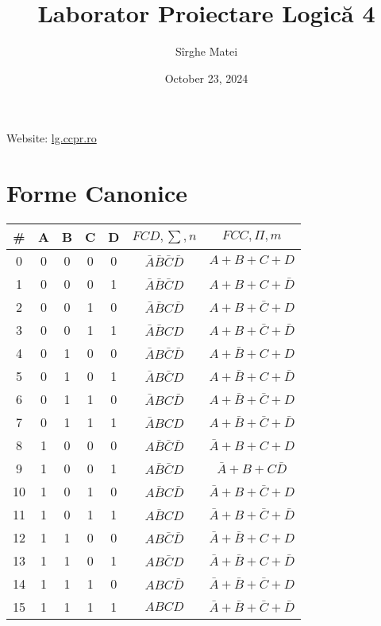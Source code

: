 \documentclass[12pt]{article}
\title{\bfseries Laborator Proiectare Logică 4}
\author{Sîrghe Matei}
\date{October 23, 2024}
\begin{document}
\maketitle

Website: \href{https://lg.ccpr.ro/}{lg.ccpr.ro}

\section{Forme Canonice}

\renewcommand{\arraystretch}{1.1}

\begin{table}[h!]
    \centering
    \begin{tabular}{|c|c|c|c|c|c|c|}
        \hline
        \# & A & B & C & D & $FCD,\sum,n$ & $FCC,\Pi,m$ \\ \hline
        0 & 0 & 0 & 0 & 0 & $\bar{A}\bar{B}\bar{C}\bar{D}$ & $A+B+C+D$ \\ \hline
        1 & 0 & 0 & 0 & 1 & $\bar{A}\bar{B}\bar{C}D$ & $A+B+C+\bar{D}$ \\ \hline
        2 & 0 & 0 & 1 & 0 & $\bar{A}\bar{B}C\bar{D}$ & $A+B+\bar{C}+D$ \\ \hline
        3 & 0 & 0 & 1 & 1 & $\bar{A}\bar{B}CD$ & $A+B+\bar{C}+\bar{D}$ \\ \hline
        4 & 0 & 1 & 0 & 0 & $\bar{A}B\bar{C}\bar{D}$ & $A+\bar{B}+C+D$ \\ \hline
        5 & 0 & 1 & 0 & 1 & $\bar{A}B\bar{C}D$ & $A+\bar{B}+C+\bar{D}$ \\ \hline
        6 & 0 & 1 & 1 & 0 & $\bar{A}BC\bar{D}$ & $A+\bar{B}+\bar{C}+D$ \\ \hline
        7 & 0 & 1 & 1 & 1 & $\bar{A}BCD$ & $A+\bar{B}+\bar{C}+\bar{D}$ \\ \hline
        8 & 1 & 0 & 0 & 0 & $A\bar{B}\bar{C}\bar{D}$ & $\bar{A}+B+C+D$ \\ \hline
        9 & 1 & 0 & 0 & 1 & $A\bar{B}\bar{C}D$ & $\bar{A}+B+C\bar{D}$ \\ \hline
        10 & 1 & 0 & 1 & 0 & $A\bar{B}C\bar{D}$ & $\bar{A}+B+\bar{C}+D$ \\ \hline
        11 & 1 & 0 & 1 & 1 & $A\bar{B}CD$ & $\bar{A}+B+\bar{C}+\bar{D}$ \\ \hline
        12 & 1 & 1 & 0 & 0 & $AB\bar{C}\bar{D}$ & $\bar{A}+\bar{B}+C+D$ \\ \hline
        13 & 1 & 1 & 0 & 1 & $AB\bar{C}D$ & $\bar{A}+\bar{B}+C+\bar{D}$ \\ \hline
        14 & 1 & 1 & 1 & 0 & $ABC\bar{D}$ & $\bar{A}+\bar{B}+\bar{C}+D$ \\ \hline
        15 & 1 & 1 & 1 & 1 & $ABCD$ & $\bar{A}+\bar{B}+\bar{C}+\bar{D}$ \\ \hline
    \end{tabular}
\end{table}
\end{document}
